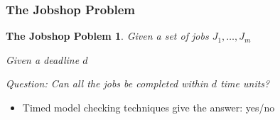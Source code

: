 \documentclass[professionalfont]{beamer}
\newtheorem{jobshopproblem}{The Jobshop Poblem}
\newcommand{\couleur}[1]{\textcolor{couleurimportante}{#1}}
\begin{document}
\begin{frame}
 \frametitle{The Jobshop Problem}

 
\begin{jobshopproblem}
	Given a set of jobs $J_1,\dots,J_m$
 
	Given a deadline $d$
 
	Question: \couleur{Can all the jobs be completed within $d$ time units?}
\end{jobshopproblem}

\pause

\begin{itemize}
	\item Timed model checking techniques give the answer: \couleur{yes/no}
\end{itemize}

\end{frame}

%    
% 
% 
\end{document}
